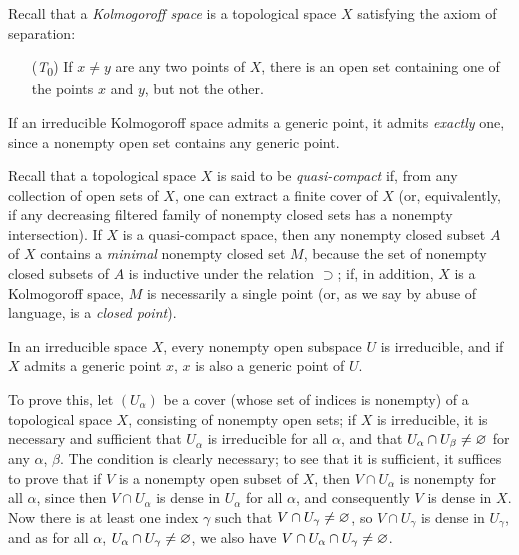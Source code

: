 \begin{env}[2.1.3]
\label{0.2.1.3}
Recall that a \emph{Kolmogoroff space} is a topological space $X$ satisfying the axiom of separation:
\begin{enumerate}
  \item[({\em T}\textsubscript{0})] If $x\neq y$ are any two points of $X$, there is an open set containing one of the points $x$ and $y$, but not the other.
\end{enumerate}

If an irreducible Kolmogoroff space admits a generic point, it admits \emph{exactly} one, since a nonempty open set contains any generic point.

Recall that a topological space $X$ is said to be \emph{quasi-compact} if, from any collection of open sets of $X$, one can extract a finite cover of $X$ (or, equivalently, if any decreasing filtered family of nonempty closed sets has a nonempty intersection).
If $X$ is a quasi-compact space, then any nonempty closed subset $A$ of $X$ contains a \emph{minimal} nonempty closed set $M$, because the set of nonempty closed subsets of $A$ is inductive under the relation $\supset$; if, in addition, $X$ is a Kolmogoroff space, $M$ is necessarily a single point (or, as we say by abuse of language, is a \emph{closed point}).
\end{env}

\begin{env}[2.1.4]
\label{0.2.1.4}
In an irreducible space $X$, every nonempty open subspace $U$ is irreducible, and if $X$ admits a generic point $x$, $x$ is also a generic point of $U$.

To prove this, let $(U_\alpha)$ be a cover (whose set of indices is nonempty) of a topological space $X$, consisting of nonempty open sets; if $X$ is irreducible, it is necessary and sufficient that $U_\alpha$ is irreducible for all $\alpha$, and that $U_\alpha\cap U_\beta\neq\varnothing$ for any $\alpha$, $\beta$.
The condition is clearly necessary; to see that it is sufficient, it suffices to prove that if $V$ is a nonempty open subset of $X$, then $V\cap U_\alpha$ is nonempty for all $\alpha$, since then $V\cap U_\alpha$ is dense in $U_\alpha$ for all $\alpha$, and consequently $V$ is dense in $X$.
Now there is at least one index $\gamma$ such that $V\cap U_\gamma\neq\varnothing$, so $V\cap U_\gamma$ is dense in $U_\gamma$, and as for all $\alpha$, $U_\alpha\cap U_\gamma\neq\varnothing$, we also have $V\cap U_\alpha\cap U_\gamma\neq\varnothing$.
\end{env}

